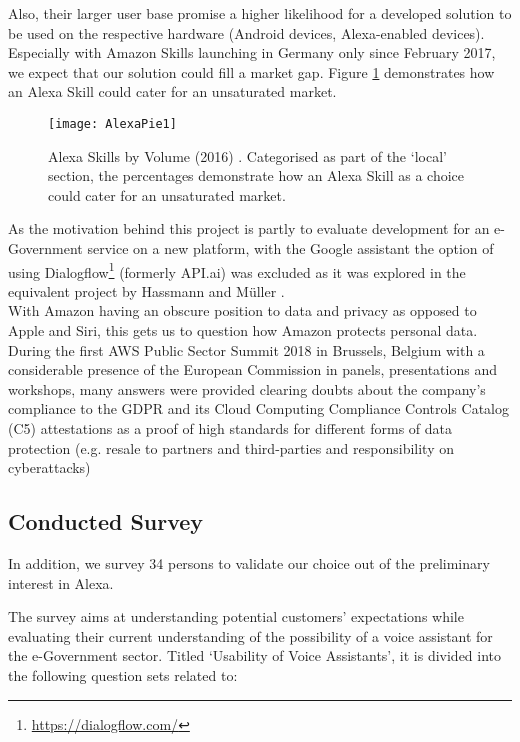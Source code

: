 Also, their larger user base promise a higher likelihood for a developed solution to be used on the respective hardware (Android devices, Alexa-enabled devices).
Especially with Amazon Skills launching in Germany only since February 2017, we expect that our solution could fill a market gap. Figure \ref{skillsbyvol} demonstrates how an Alexa Skill could cater for an unsaturated market.




\begin{figure}[h]
	\caption[Alexa Skills by Volume (2016)]{Alexa Skills by Volume (2016) \cite{voicelabs:trends}. Categorised as part of the `local' section, the percentages demonstrate how an Alexa Skill as a choice could cater for an unsaturated market.}
	\label{skillsbyvol}
	\texttt{[image: AlexaPie1]} 
\end{figure}


As the motivation behind this project is partly to evaluate development for an e-Government service on a new platform, with the Google assistant the option of using Dialogflow\footnote{\url{https://dialogflow.com/}} (formerly API.ai) was excluded as it was explored in the equivalent project by Hassmann and Müller \cite{hassmannMlr:berlina}.\\



With Amazon having an obscure position to data and privacy as opposed to Apple and Siri, this gets us to question how Amazon protects personal data. During the first AWS Public Sector Summit 2018 in Brussels, Belgium with a considerable presence of the European Commission in panels, presentations and workshops, many answers were provided clearing doubts about the company's compliance to the GDPR and its Cloud Computing Compliance Controls Catalog (C5) attestations as a proof of high standards for different forms of data protection (e.g. resale to partners and third-parties and responsibility on cyberattacks) \cite{aws:pubsecsum}


\subsection*{Conducted Survey}

In addition, we  survey 34 persons to validate our choice out of the preliminary interest in Alexa. 


The survey aims at understanding potential customers' expectations while evaluating their current understanding of the possibility of a voice assistant for the e-Government sector. Titled `Usability of Voice Assistants', it is divided into the following question sets related to:

